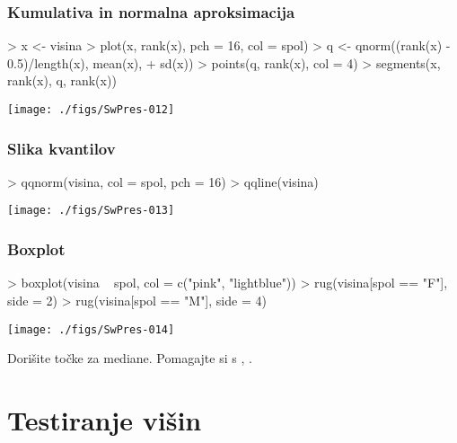 \begin{frame}[fragile]
\frametitle{Kumulativa in normalna aproksimacija}
 {\vspace{-1cm}}
\begin{Schunk}
\begin{Sinput}
> x <- visina
> plot(x, rank(x), pch = 16, col = spol)
> q <- qnorm((rank(x) - 0.5)/length(x), mean(x), 
+     sd(x))
> points(q, rank(x), col = 4)
> segments(x, rank(x), q, rank(x))
\end{Sinput}
\end{Schunk}
\texttt{[image: ./figs/SwPres-012]}
\end{frame}
\begin{frame}[fragile]
\frametitle{Slika kvantilov}
 {\vspace{-1cm}}
\begin{Schunk}
\begin{Sinput}
> qqnorm(visina, col = spol, pch = 16)
> qqline(visina)
\end{Sinput}
\end{Schunk}
\texttt{[image: ./figs/SwPres-013]}
\end{frame}
\begin{frame}[fragile]
\frametitle{Boxplot}
 {\vspace{-1cm}}
\begin{Schunk}
\begin{Sinput}
> boxplot(visina ~ spol, col = c("pink", "lightblue"))
> rug(visina[spol == "F"], side = 2)
> rug(visina[spol == "M"], side = 4)
\end{Sinput}
\end{Schunk}
\texttt{[image: ./figs/SwPres-014]}

Dorišite točke za mediane. Pomagajte si s , . 
\end{frame}

\section{Testiranje višin}

